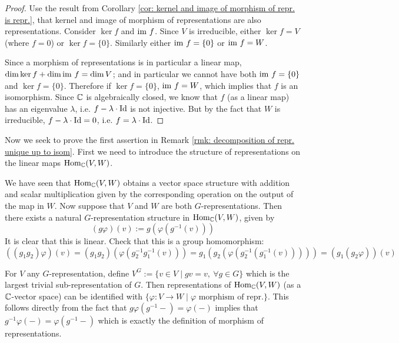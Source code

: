 \documentclass{article}
\begin{document}
\begin{proof}
    Use the result from Corollary \ref{cor: kernel and image of morphism of repr. is repr.}, that kernel and image of morphism of representations are also representations. Consider $\ker f$ and $\mathrm{im}\  f$. Since $V$ is irreducible, either $\ker f = V$ (where $f = 0$) or $\ker f = \{0\}$. Similarly either $\mathrm{im}\  f = \{0\}$ or $\mathrm{im}\  f = W$.
    
    Since a morphism of representations is in particular a linear map, $\dim \ker f + \dim \mathrm{im}\  f = \dim V$; and in particular we cannot have both $\mathrm{im}\  f = \{0\}$ and $\ker f = \{0\}$. Therefore if $\ker f = \{0\}$, $\mathrm{im}\  f = W$, which implies that $f$ is an isomorphism. Since $\mathbb{C}$ is algebraically closed, we know that $f$ (as a linear map) has an eigenvalue $\lambda$, i.e. $f - \lambda \cdot \mathrm{Id}$ is not injective. But by the fact that $W$ is irreducible, $f - \lambda \cdot \mathrm{Id} = 0$, i.e. $f = \lambda \cdot \mathrm{Id}$. 
\end{proof}

\textstart
Now we seek to prove the first assertion in Remark \ref{rmk: decomposition of repr. unique up to isom}. First we need to introduce the structure of representations on the linear maps $\mathrm{Hom}_{\mathbb{C}}(V, W)$.

We have seen that $\mathrm{Hom}_{\mathbb{C}}(V, W)$ obtains a vector space structure with addition and scalar multiplication given by the corresponding operation on the output of the map in $W$. Now suppose that $V$ and $W$ are both $G$-representations. Then there exists a natural $G$-representation structure in $\mathrm{Hom}_{\mathbb{C}}(V, W)$, given by 
\[
    (g \varphi)(v) := g\left( \varphi(g^{-1}(v)) \right)
\]
It is clear that this is linear. Check that this is a group homomorphism:
\[
    ((g_1 g_2) \varphi)(v) = (g_1 g_2) (\varphi ( g_2^{-1} g_1^{-1}(v) )) = g_1\left( g_2 (\varphi(g_2^{-1}(g_1^{-1}(v)))) \right) = (g_1 (g_2 \varphi))(v)
\]

\begin{remark}
    For $V$ any $G$-representation, define $V^G := \{ v \in V \mid gv = v,\ \forall g \in G \}$ which is the largest trivial sub-representation of $G$. Then representations of $\mathrm{Hom}_{\mathbb{C}}(V, W)$ (as a $\mathbb{C}$-vector space) can be identified with $\{ \varphi: V \to W \mid \varphi \text{ morphism of repr.} \}$. This follows directly from the fact that $g\varphi(g^{-1} -) = \varphi(-)$ implies that $g^{-1}\varphi(-) = \varphi(g^{-1}-)$ which is exactly the definition of morphism of representations.
\end{remark}
\end{document}
